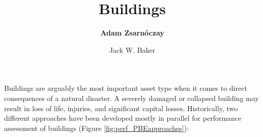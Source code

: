 %
%
%


%
%
%
%
%
%
%
%

\title{Buildings}
\author{
    \textbf{Adam Zsarnóczay}
    \and Jack W. Baker}
\tocauthor{}
%
%
\maketitle

Buildings are arguably the most important asset type when it comes to direct consequences of a natural disaster. A severely damaged or collapsed building may result in loss of life, injuries, and significant capital losses. Historically, two different approaches have been developed mostly in parallel for performance assessment of buildings (Figure \ref{fig:perf_PBEapproaches}):

